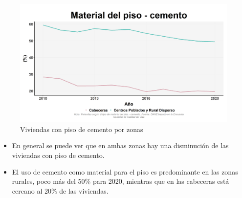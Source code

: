     \begin{figure}[H]
        \caption{Viviendas con piso de cemento por zonas \label{map_result_2} }
        \begin{center}
        \includegraphics[width=\textwidth,keepaspectratio]{img/var_178_trend.png}
        \end{center}
    \end{figure}
            \begin{itemize}
                    \item En general se puede ver que en ambas zonas hay una disminución de las viviendas con piso de cemento.
                    \item El uso de cemento como material para el piso es predominante en las zonas rurales, poco más del 50\% para 2020, mientras que en las cabeceras está cercano al 20\% de las viviendas.
                    \end{itemize}

